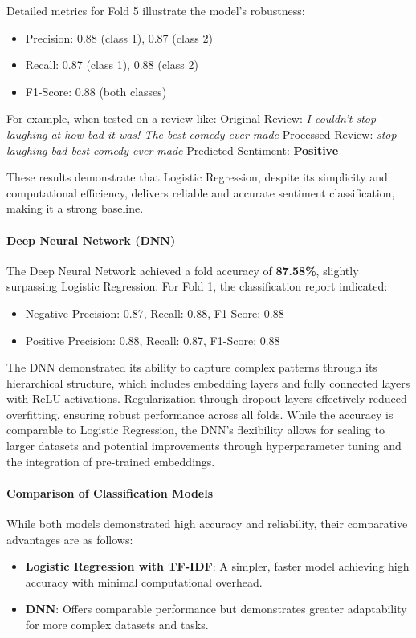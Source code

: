 \documentclass{article}
\begin{document}
Detailed metrics for Fold 5 illustrate the model’s robustness:
\begin{itemize} \item Precision: 0.88 (class 1), 0.87 (class 2)
\item Recall: 0.87 (class 1), 0.88 (class 2)
\item F1-Score: 0.88 (both classes)
\end{itemize}

For example, when tested on a review like:
Original Review: \textit{I couldn’t stop laughing at how bad it was! The best comedy ever made}
Processed Review: \textit{stop laughing bad best comedy ever made}
Predicted Sentiment: \textbf{Positive}

These results demonstrate that Logistic Regression, despite its simplicity and computational efficiency, delivers reliable and accurate sentiment classification, making it a strong baseline.

\paragraph{Deep Neural Network (DNN)}
The Deep Neural Network achieved a fold accuracy of \textbf{87.58\%}, slightly surpassing Logistic Regression. For Fold 1, the classification report indicated:
\begin{itemize} 
\item Negative Precision: 0.87, Recall: 0.88, F1-Score: 0.88
\item Positive Precision: 0.88, Recall: 0.87, F1-Score: 0.88
\end{itemize}

The DNN demonstrated its ability to capture complex patterns through its hierarchical structure, which includes embedding layers and fully connected layers with ReLU activations. Regularization through dropout layers effectively reduced overfitting, ensuring robust performance across all folds. While the accuracy is comparable to Logistic Regression, the DNN’s flexibility allows for scaling to larger datasets and potential improvements through hyperparameter tuning and the integration of pre-trained embeddings.

\paragraph{Comparison of Classification Models}
While both models demonstrated high accuracy and reliability, their comparative advantages are as follows:
\begin{itemize}
    \item \textbf{Logistic Regression with TF-IDF}: A simpler, faster model achieving high accuracy with minimal computational overhead.
    \item \textbf{DNN}: Offers comparable performance but demonstrates greater adaptability for more complex datasets and tasks.
\end{itemize}
\end{document}
